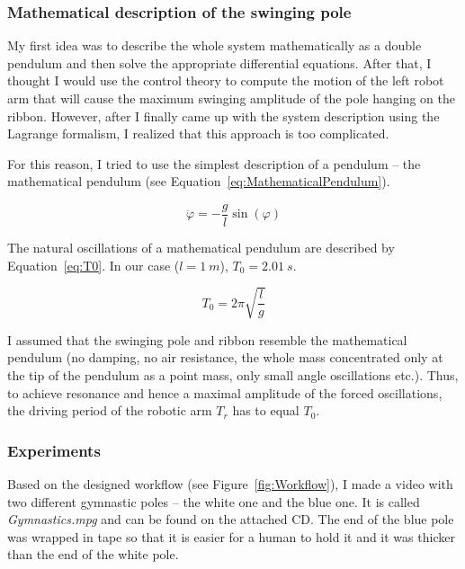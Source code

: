         \subsubsection{Mathematical description of the swinging pole}

            My first idea was to describe the whole system mathematically as a double pendulum and then solve the appropriate differential equations. After that, I thought I would use the control theory to compute the motion of the left robot arm that will cause the maximum swinging amplitude of the pole hanging on the ribbon. However, after I finally came up with the system description using the Lagrange formalism, I realized that this approach is too complicated.

            For this reason, I tried to use the simplest description of a pendulum -- the mathematical pendulum (see Equation~\eqref{eq:MathematicalPendulum}).

            \begin{equation} \label{eq:MathematicalPendulum}
                \ddot{\varphi} = -\frac{g}{l}\sin(\varphi)
            \end{equation}

            The natural oscillations of a mathematical pendulum are described by Equation~\eqref{eq:T0}. In our case ($l = \SI{1}{m}$), $T_0 = \SI{2.01}{s}$.

            \begin{equation} \label{eq:T0}
                T_0 = 2 \pi \sqrt{\frac{l}{g}}
            \end{equation}

            I assumed that the swinging pole and ribbon resemble the mathematical pendulum (no damping, no air resistance, the whole mass concentrated only at the tip of the pendulum as a point mass, only small angle oscillations etc.). Thus, to achieve resonance and hence a maximal amplitude of the forced oscillations, the driving period of the robotic arm $T_r$ has to equal $T_0$.


        \subsubsection{Experiments}
            Based on the designed workflow (see Figure~\ref{fig:Workflow}), I made a video with two different gymnastic poles -- the white one and the blue one. It is called \textit{Gymnastics.mpg} and can be found on the attached CD. The end of the blue pole was wrapped in tape so that it is easier for a human to hold it and it was thicker than the end of the white pole.

